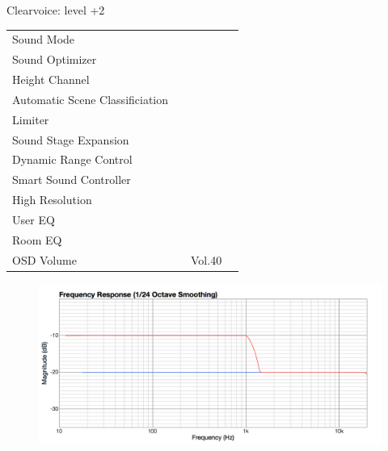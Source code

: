 \documentclass{beamer}
\begin{document}
\begin{frame}[t]{Clearvoice: level +2}
\begin{tiny}
\begin{tabular}{@{}lccc@{}}
Sound Mode & \color{black}{Off} & & \\
Sound Optimizer & \color{black}{Off} & & \\
Height Channel & \color{black}{Off} & & \\
Automatic Scene Classificiation & \color{black}{Off} & & \\
Limiter & \color{black}{Off} & & \\
Sound Stage Expansion & \color{black}{Off} & & \\
Dynamic Range Control & \color{black}{Off} & & \\
Smart Sound Controller & \color{black}{Off} & & \\
High Resolution & \color{black}{Off} & & \\
User EQ & \color{black}{Off} & & \\
Room EQ & \color{black}{Off} & & \\
OSD Volume & \color{blue}{On} & Vol.40 & \\
\midrule
\end{tabular}
\end{tiny}

\begin{figure}[b]
\includegraphics[height=0.32\textwidth]{figure/cv2.png}
\end{figure}

\end{frame}
\end{document}
